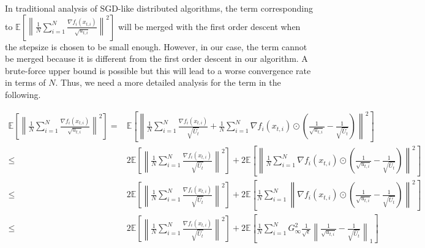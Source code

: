 \documentclass{article} %
\begin{document}
In traditional analysis of SGD-like distributed algorithms, the term corresponding to $ \mathbb E \left[  \left\| \frac{1}{N} \sum_{i=1}^N \frac{\nabla f_i(x_{t,i})}{\sqrt{u_{t,i}}} \right\|^2     \right] $ will be merged with the first order descent when the stepsize is chosen to be small enough. However, in our case, the term cannot be merged because it is different from the first order descent in our algorithm. A brute-force upper bound is possible but this will lead to a worse convergence rate in terms of $N$. Thus, we need a more detailed analysis for the term in the following.

\begin{align}
\mathbb E \left[  \left\| \frac{1}{N} \sum_{i=1}^N \frac{\nabla f_i(x_{t,i})}{\sqrt{u_{t,i}}} \right\|^2     \right]  =& \mathbb E \left[  \left\|\frac{1}{N} \sum_{i=1}^N \frac{\nabla f_i(x_{t,i})}{\sqrt{\overline U_t}  } +   \frac{1}{N} \sum_{i=1}^N \nabla f_i(x_{t,i}) \odot \left( \frac{1}{\sqrt{u_{t,i}}} - \frac{1}{\sqrt{\overline U_{t}}} \right) \right\|^2     \right] \nonumber \\
\leq & 2 \mathbb E \left[  \left\|\frac{1}{N} \sum_{i=1}^N \frac{\nabla f_i(x_{t,i})}{\sqrt{\overline U_t}  } \right\|^2 \right] + 2\mathbb E \left[ \left\|  \frac{1}{N} \sum_{i=1}^N \nabla f_i(x_{t,i}) \odot \left( \frac{1}{\sqrt{u_{t,i}}} - \frac{1}{\sqrt{\overline U_{t}}} \right) \right\|^2     \right] \nonumber \\
\leq & 2 \mathbb E \left[  \left\|\frac{1}{N} \sum_{i=1}^N \frac{\nabla f_i(x_{t,i})}{\sqrt{\overline U_t}  } \right\|^2 \right] + 2\mathbb E \left[  \frac{1}{N} \sum_{i=1}^N \left\|    \nabla f_i(x_{t,i}) \odot \left( \frac{1}{\sqrt{u_{t,i}}} - \frac{1}{\sqrt{\overline U_{t}}} \right) \right\|^2     \right] \nonumber \\
\leq & 2 \mathbb E \left[  \left\|\frac{1}{N} \sum_{i=1}^N \frac{\nabla f_i(x_{t,i})}{\sqrt{\overline U_t}  } \right\|^2 \right] + 2\mathbb E \left[  \frac{1}{N} \sum_{i=1}^N G_{\infty}^2  \frac{1}{\sqrt{\epsilon}}\left\|     \frac{1}{\sqrt{u_{t,i}}} - \frac{1}{\sqrt{\overline U_{t}}}  \right\|_1     \right]
\end{align}
\end{document}
